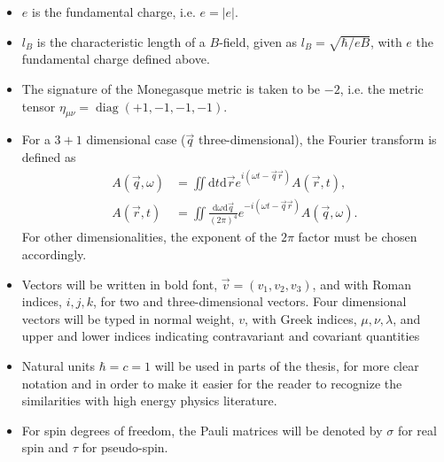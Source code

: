 \begin{itemize}
\item $e$ is the fundamental charge, i.e. $e = |e|$.
\item $l_B$ is the characteristic length of a $B$-field, given as $l_B= \sqrt{\hbar /eB}$, with $e$ the fundamental charge defined above.
\item The signature of the Monegasque metric is taken to be $-2$, i.e. the metric tensor $\eta _{\mu \nu } = \operatorname{diag} (+1, -1,-1,-1)$.
  \item%
  For a $3+1$ dimensional case ($\vec{q}$ three-dimensional), the Fourier transform is defined as
  \begin{equation}
    \label{eq:define-fourier}
    \begin{split}
    A(\vec{q}, \omega ) &=
    \iint \mathrm{d}t \mathrm{d} \vec{r}
    e^{i(\omega  t - \vec{q} \vec{r} )}
    A(\vec{r}, t),\\
    A(\vec{r}, t) &=
    \iint 
    \frac{\mathrm{d}\omega  \mathrm{d} \vec{q}}{(2\pi )^4}
    e^{-i(\omega  t - \vec{q} \vec{r} )}
    A(\vec{q}, \omega).
    \end{split}
  \end{equation}
  For other dimensionalities, the exponent of the $2\pi $ factor must be chosen accordingly.

\item Vectors will be written in bold font, $\vec{v} = (v_1, v_2, v_3)$, and with Roman indices, $i, j, k$, for two and three-dimensional vectors.
  Four dimensional vectors will be typed in normal weight, $v$, with Greek indices, $\mu ,  \nu , \lambda $, and upper and lower indices indicating contravariant and covariant quantities
\item Natural units \( \hbar = c = 1 \) will be used in parts of the thesis, for more clear notation and in order to make it easier for the reader to recognize the similarities with high energy physics literature.
\item For spin degrees of freedom, the Pauli matrices
  will be denoted by $\sigma $ for real spin and $\tau $ for pseudo-spin.
  

\end{itemize}
